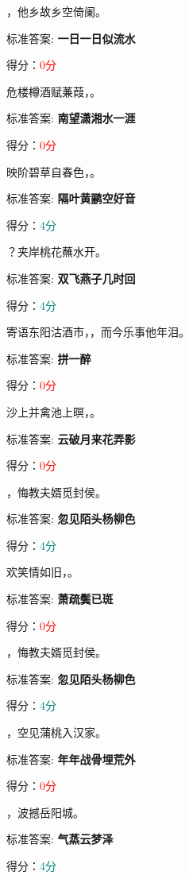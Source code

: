 \documentclass[12pt, a4paper, addpoints, answers]{exam}
\begin{document}
\begin{questions}
\question[4] \fillin ，他乡故乡空倚阑。

标准答案: \textbf{一日一日似流水}   

得分：\textcolor{red}{0分} 

\question[4] 危楼樽酒赋蒹葭，\fillin 。

标准答案: \textbf{南望潇湘水一涯}   

得分：\textcolor{red}{0分} 

\question[4] 映阶碧草自春色，\fillin[隔叶黄鹂空好音] 。

标准答案: \textbf{隔叶黄鹂空好音}   

得分：\textcolor{teal}{4分} 

\question[4] \fillin[双飞燕子几时回] ？夹岸桃花蘸水开。

标准答案: \textbf{双飞燕子几时回}   

得分：\textcolor{teal}{4分} 

\question[4] 寄语东阳沽酒市，\fillin ，而今乐事他年泪。

标准答案: \textbf{拼一醉}   

得分：\textcolor{red}{0分} 

\question[4] 沙上并禽池上暝，\fillin 。

标准答案: \textbf{云破月来花弄影}   

得分：\textcolor{red}{0分} 

\question[4] \fillin[忽见陌头杨柳色] ，悔教夫婿觅封侯。

标准答案: \textbf{忽见陌头杨柳色}   

得分：\textcolor{teal}{4分} 

\question[4] 欢笑情如旧，\fillin 。

标准答案: \textbf{萧疏鬓已斑}   

得分：\textcolor{red}{0分} 

\question[4] \fillin[忽见陌头杨柳色] ，悔教夫婿觅封侯。

标准答案: \textbf{忽见陌头杨柳色}   

得分：\textcolor{teal}{4分} 

\question[4] \fillin ，空见蒲桃入汉家。

标准答案: \textbf{年年战骨埋荒外}   

得分：\textcolor{red}{0分} 

\question[4] \fillin[气蒸云梦泽] ，波撼岳阳城。

标准答案: \textbf{气蒸云梦泽}   

得分：\textcolor{teal}{4分} 


\end{questions}
\end{document}
